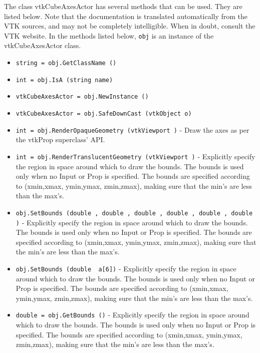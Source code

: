 The class vtkCubeAxesActor has several methods that can be used.
  They are listed below.
Note that the documentation is translated automatically from the VTK sources,
and may not be completely intelligible.  When in doubt, consult the VTK website.
In the methods listed below, \verb|obj| is an instance of the vtkCubeAxesActor class.
\begin{itemize}
\item  \verb|string = obj.GetClassName ()|

\item  \verb|int = obj.IsA (string name)|

\item  \verb|vtkCubeAxesActor = obj.NewInstance ()|

\item  \verb|vtkCubeAxesActor = obj.SafeDownCast (vtkObject o)|

\item  \verb|int = obj.RenderOpaqueGeometry (vtkViewport )| -  Draw the axes as per the vtkProp superclass' API.

\item  \verb|int = obj.RenderTranslucentGeometry (vtkViewport )| -  Explicitly specify the region in space around which to draw the bounds.
 The bounds is used only when no Input or Prop is specified. The bounds
 are specified according to (xmin,xmax, ymin,ymax, zmin,zmax), making
 sure that the min's are less than the max's.

\item  \verb|obj.SetBounds (double , double , double , double , double , double )| -  Explicitly specify the region in space around which to draw the bounds.
 The bounds is used only when no Input or Prop is specified. The bounds
 are specified according to (xmin,xmax, ymin,ymax, zmin,zmax), making
 sure that the min's are less than the max's.

\item  \verb|obj.SetBounds (double  a[6])| -  Explicitly specify the region in space around which to draw the bounds.
 The bounds is used only when no Input or Prop is specified. The bounds
 are specified according to (xmin,xmax, ymin,ymax, zmin,zmax), making
 sure that the min's are less than the max's.

\item  \verb|double = obj.GetBounds ()| -  Explicitly specify the region in space around which to draw the bounds.
 The bounds is used only when no Input or Prop is specified. The bounds
 are specified according to (xmin,xmax, ymin,ymax, zmin,zmax), making
 sure that the min's are less than the max's.


\end{itemize}
